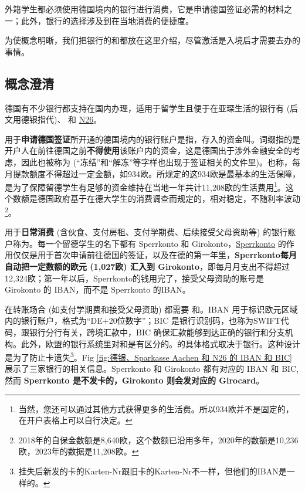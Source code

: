   外籍学生都必须使用德国境内的银行进行消费，它是申请德国签证必需的材料之一；此外，银行的选择涉及到在当地消费的便捷度。

  为使概念明晰，我们把银行的和都放在这里介绍，尽管激活是入境后才需要去办的事情。

  \subsection{概念澄清}\label{subsec:概念澄清}
 
    德国有不少银行都支持在国内办理，适用于留学生且便于在亚琛生活的银行有\href{https://www.deutsche-bank.de/pk.html}{} (后文用德银指代)、\href{https://www.sparkasse-aachen.de/de/home.html}{} 和 \href{https://n26.com/en-de/free-bank-account}{N26}。

    用于\textbf{申请德国签证}所开通的德国境内的银行账户是指，存入的资金叫。词缀指的是开户人在前往德国之前\textbf{不得使用}该账户内的资金，这是德国出于涉外金融安全的考虑，因此也被称为 (``冻结''和``解冻''等字样也出现于签证相关的文件里)。也称，每月提款额度不得超过一定金额，如934欧。所规定的这934欧是最基本的生活保障，是为了保障留德学生有足够的资金维持在当地一年共计11,208欧的生活费用\footnote{当然，您还可以通过其他方式获得更多的生活费。所以934欧并不是固定的，在开户表格上可以自行决定。}。这个数额是德国政府基于在德大学生的消费调查而规定的，相对稳定，不随利率波动\footnote{2018年的自保金数额是8,640欧，这个数额已沿用多年，2020年的数额是10,236欧，2023年的数据是11,208欧。}。

    用于\textbf{日常消费} (含伙食、支付房租、支付学期费、后续接受父母资助等) 的银行账户称为。每一个留德学生的名下都有 Sperrkonto 和 Girokonto，\href{https://china.diplo.de/blob/1341652/c79bd5edf0554386e9c4285bd447c2fc/pdf-merkblatt-natvisum-studium-data.pdf}{Sperrkonto} 的作用仅仅是用于首次申请前往德国的签证，以及在德的第一年里，\textbf{Sperrkonto每月自动把一定数额的欧元 (1,027欧) 汇入到 Girokonto}，即每月月支出不得超过12,324欧；第一年以后，Sperrkonto的钱用完了，接受父母资助的账号是 Girokonto 的 IBAN，而不是 Sperrkonto 的IBAN。

    在转账场合 (如支付学期费和接受父母资助) 都需要  和。IBAN 用于标识欧元区域内的银行账户，格式为``DE+20位数字''；BIC 是银行识别码，也称为SWIFT代码，跟银行分行有关，跨境汇款中，BIC 确保汇款能够到达正确的银行和分支机构。此外，欧盟的银行系统里对和是有区分的。的具体格式取决于银行。这种设计是为了防止卡遗失\footnote{挂失后新发的卡的Karten-Nr跟旧卡的Karten-Nr不一样，但他们的IBAN是一样的。}。Fig \ref{fig:德银、Sparkasse Aachen 和 N26 的 IBAN 和 BIC} 展示了三家银行的相关信息。Sperrkonto 和 Girokonto 都有对应的 IBAN 和 BIC, 然而 \textbf{Sperrkonto 是不发卡的，Girokonto 则会发对应的 Girocard}。

